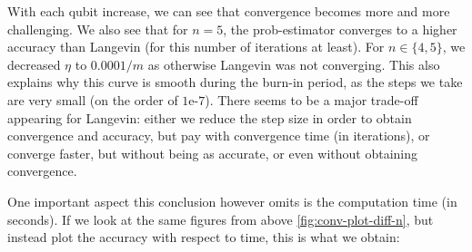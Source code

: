 \documentclass[12pt]{memoir}
\begin{document}
With each qubit increase, we can see that convergence becomes more and more challenging. We also see that for $n=5$, the prob-estimator converges to a higher accuracy than Langevin (for this number of iterations at least). For $n\in\{4,5\}$, we decreased $\eta$ to $0.0001/m$ as otherwise Langevin was not converging. This also explains why this curve is smooth during the burn-in period, as the steps we take are very small (on the order of $1\text{e-}7$). There seems to be a major trade-off appearing for Langevin: either we reduce the step size in order to obtain convergence and accuracy, but pay with convergence time (in iterations), or converge faster, but without being as accurate, or even without obtaining convergence. \medbreak


One important aspect this conclusion however omits is the computation time (in seconds). If we look at the same figures from above \ref{fig:conv-plot-diff-n}, but instead plot the accuracy with respect to time, this is what we obtain:
\end{document}
